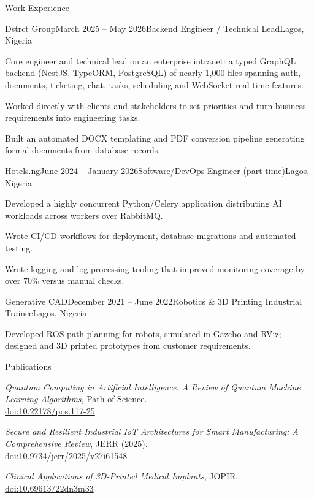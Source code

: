 \documentclass{resume}
\begin{document}
\newpage
\begin{rSection}{Work Experience}

\begin{rSubsection}{Dstrct Group}{March 2025 -- May 2026}{Backend Engineer / Technical Lead}{Lagos, Nigeria}
\item Core engineer and technical lead on an enterprise intranet: a typed GraphQL backend (NestJS, TypeORM, PostgreSQL) of nearly 1,000 files spanning auth, documents, ticketing, chat, tasks, scheduling and WebSocket real-time features.
\item Worked directly with clients and stakeholders to set priorities and turn business requirements into engineering tasks.
\item Built an automated DOCX templating and PDF conversion pipeline generating formal documents from database records.
\end{rSubsection}

\begin{rSubsection}{Hotels.ng}{June 2024 -- January 2026}{Software/DevOps Engineer (part-time)}{Lagos, Nigeria}
\item Developed a highly concurrent Python/Celery application distributing AI workloads across workers over RabbitMQ.
\item Wrote CI/CD workflows for deployment, database migrations and automated testing.
\item Wrote logging and log-processing tooling that improved monitoring coverage by over 70\% versus manual checks.
\end{rSubsection}

\begin{rSubsection}{Generative CAD}{December 2021 -- June 2022}{Robotics \& 3D Printing Industrial Trainee}{Lagos, Nigeria}
\item Developed ROS path planning for robots, simulated in Gazebo and RViz; designed and 3D printed prototypes from customer requirements.
\end{rSubsection}

\end{rSection}

\begin{rSection}{Publications}
\item \textit{Quantum Computing in Artificial Intelligence: A Review of Quantum Machine Learning Algorithms}, Path of Science.\\ \href{http://dx.doi.org/10.22178/pos.117-25}{doi:10.22178/pos.117-25}
\item \textit{Secure and Resilient Industrial IoT Architectures for Smart Manufacturing: A Comprehensive Review}, JERR (2025).\\ \href{https://doi.org/10.9734/jerr/2025/v27i61548}{doi:10.9734/jerr/2025/v27i61548}
\item \textit{Clinical Applications of 3D-Printed Medical Implants}, JOPIR.\\ \href{https://doi.org/10.69613/22dn3m33}{doi:10.69613/22dn3m33}
\end{rSection}
\end{document}
